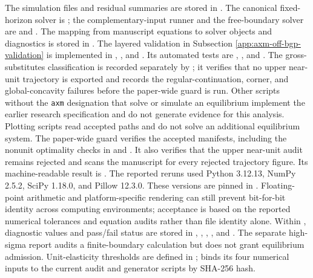 \begin{sloppypar}
The simulation files and residual summaries are stored in
. The canonical fixed-horizon solver is
; the complementary-input runner and
the free-boundary solver are
 and
. The mapping from manuscript
equations to solver objects and diagnostics is stored in
. The layered validation in
Subsection \ref{app:axm-off-bgp-validation} is
implemented in ,
, and
. Its automated tests are
,
, and
.
The gross-substitutes classification is recorded separately by
; it verifies that no upper
near-unit trajectory is exported and records the regular-continuation, corner,
and global-concavity failures before the paper-wide guard is run.
Other scripts without the \texttt{axm} designation that solve or simulate an
equilibrium implement the earlier research specification and do not generate
evidence for this analysis.
Plotting scripts read accepted paths and do not solve an additional equilibrium
system. The paper-wide guard
 verifies the accepted
manifests, including the nonunit optimality checks in
 and
. It also verifies that
the upper near-unit audit remains rejected and scans the manuscript for every
rejected trajectory figure. Its
machine-readable result is
.
The reported reruns used Python 3.12.13, NumPy 2.5.2, SciPy 1.18.0, and Pillow
12.3.0. These versions are pinned in .
Floating-point arithmetic and platform-specific rendering can still prevent
bit-for-bit identity across computing environments; acceptance is based on the
reported numerical tolerances and equation audits rather than file identity
alone.
Within , diagnostic values and pass/fail status are stored in
, ,
,
, and
. The separate high-sigma report
audits a finite-boundary calculation but does not grant equilibrium admission.
Unit-elasticity thresholds are defined in
;
 binds its four numerical inputs to
the current audit and generator scripts by SHA-256 hash.
\end{sloppypar}


